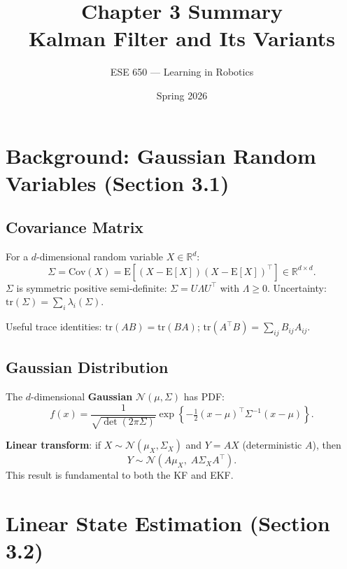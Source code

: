 \documentclass[12pt, a4paper]{article}
\title{\textbf{Chapter 3 Summary}\\[0.3em]
\large Kalman Filter and Its Variants}
\author{ESE 650 --- Learning in Robotics}
\date{Spring 2026}
\begin{document}
\maketitle
\tableofcontents
\newpage

\section{Background: Gaussian Random Variables (Section 3.1)}

\subsection{Covariance Matrix}

For a $d$-dimensional random variable $X\in\mathbb{R}^d$:
\begin{equation}
  \Sigma = \mathrm{Cov}(X) = \mathrm{E}[(X-\mathrm{E}[X])(X-\mathrm{E}[X])^\top] \in \mathbb{R}^{d\times d}.
\end{equation}
$\Sigma$ is symmetric positive semi-definite: $\Sigma=U\Lambda U^\top$
with $\Lambda\ge0$. Uncertainty: $\mathrm{tr}(\Sigma)=\sum_i\lambda_i(\Sigma)$.

Useful trace identities: $\mathrm{tr}(AB)=\mathrm{tr}(BA)$; $\mathrm{tr}(A^\top B)=\sum_{ij}B_{ij}A_{ij}$.

\subsection{Gaussian Distribution}

The $d$-dimensional \textbf{Gaussian} $\mathcal{N}(\mu,\Sigma)$ has PDF:
\begin{equation}
  f(x) = \frac{1}{\sqrt{\det(2\pi\Sigma)}}
  \exp\!\left\{-\tfrac{1}{2}(x-\mu)^\top\Sigma^{-1}(x-\mu)\right\}.
\end{equation}

\textbf{Linear transform}: if $X\sim\mathcal{N}(\mu_X,\Sigma_X)$ and
$Y=AX$ (deterministic $A$), then
\begin{equation}
  Y\sim\mathcal{N}(A\mu_X,\; A\Sigma_X A^\top).
  \label{eq:gaussian_linear}
\end{equation}
This result is fundamental to both the KF and EKF.

\section{Linear State Estimation (Section 3.2)}
\end{document}
